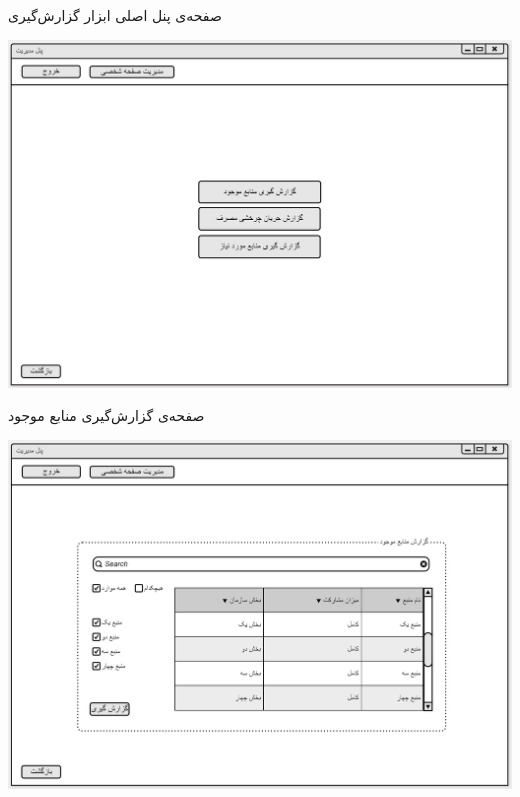 \vspace{1cm}
صفحه‌ی پنل اصلی ابزار گزارش‌گیری
\begin{center}
\includegraphics[width=\textwidth]{Prototype/Reporting/ReportHomePage.png}
\end{center}

\newpage
\vspace{1cm}
صفحه‌ی گزارش‌گیری منابع موجود
\begin{center}
\includegraphics[width=\textwidth]{Prototype/Reporting/ResourceReport.png}
\end{center}

